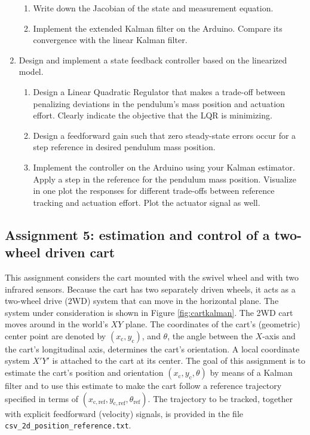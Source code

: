 \documentclass[10pt,a4paper]{article}
\begin{document}
\begin{enumerate}
\begin{enumerate}
  \item Write down the Jacobian of the state and measurement equation.
  \item Implement the extended Kalman filter on the Arduino. Compare its convergence with the linear Kalman filter.
  \end{enumerate}
  \item Design and implement a state feedback controller based on the linearized model.
  \begin{enumerate}
    \item Design a Linear Quadratic Regulator that makes a trade-off between penalizing deviations in the pendulum's mass position and actuation effort. Clearly indicate the objective that the LQR is minimizing.
    \item Design a feedforward gain such that zero steady-state errors occur for a step reference in desired pendulum mass position.
    \item Implement the controller on the Arduino using your Kalman estimator. Apply a step in the reference for the pendulum mass position. Visualize in one plot the responses for different trade-offs between reference tracking and actuation effort. Plot the actuator signal as well.
  \end{enumerate}
\end{enumerate}

\subsection{Assignment 5: estimation and control of a two-wheel driven cart}
This assignment considers the cart mounted with the swivel wheel and with two infrared sensors. Because the cart has two separately driven wheels, it acts as a two-wheel drive (2WD) system that can move in the horizontal plane.
The system under consideration is shown in Figure \ref{fig:cartkalman}. The 2WD cart moves around in the world's $XY$ plane. The coordinates of the cart's (geometric) center point are denoted by $(x_{\mathrm{c}},y_{\mathrm{c}})$, and $\theta$, the angle between the $X$-axis and the cart's longitudinal axis, determines the cart's orientation. A local coordinate system $X'Y'$ is attached to the cart at its center. The goal of this assignment is to estimate the cart's position and orientation $(x_{\mathrm{c}},y_{\mathrm{c}},\theta)$ by means of a Kalman filter and to use this estimate to make the cart follow a reference trajectory specified in terms of $(x_{\mathrm{c,ref}},y_{\mathrm{c,ref}},\theta_{\mathrm{ref}})$. The trajectory to be tracked, together with explicit feedforward (velocity) signals, is provided in the file \texttt{csv\_2d\_position\_reference.txt}.
\end{document}
